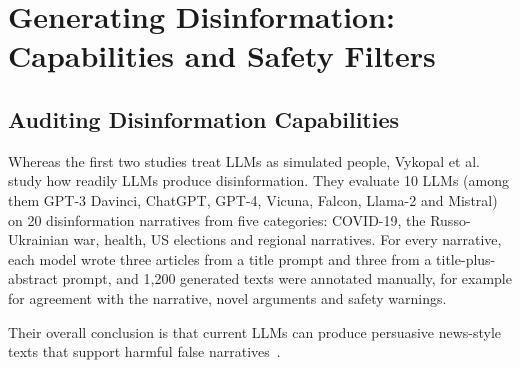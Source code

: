 \section{Generating Disinformation: Capabilities and Safety Filters}
\label{sec:disinformation_generation}

\subsection{Auditing Disinformation Capabilities}
Whereas the first two studies treat LLMs as simulated people, Vykopal et al.~\cite{vykopal2024disinformation} study how readily LLMs produce disinformation. They evaluate 10 LLMs (among them GPT-3 Davinci, ChatGPT, GPT-4, Vicuna, Falcon, Llama-2 and Mistral) on 20 disinformation narratives from five categories: COVID-19, the Russo-Ukrainian war, health, US elections and regional narratives. For every narrative, each model wrote three articles from a title prompt and three from a title-plus-abstract prompt, and 1,200 generated texts were annotated manually, for example for agreement with the narrative, novel arguments and safety warnings. %

Their overall conclusion is that current LLMs can produce persuasive news-style texts that support harmful false narratives~\cite{vykopal2024disinformation}. %

